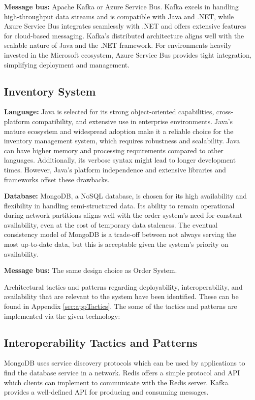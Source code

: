 \documentclass[conference]{IEEEtran}
\begin{document}
\textbf{Message bus:} Apache Kafka or Azure Service Bus. Kafka excels in handling high-throughput data streams and is compatible with Java and .NET, while Azure Service Bus integrates seamlessly with .NET and offers extensive features for cloud-based messaging. Kafka's distributed architecture aligns well with the scalable nature of Java and the .NET framework. For environments heavily invested in the Microsoft ecosystem, Azure Service Bus provides tight integration, simplifying deployment and management.


\subsection*{Inventory System}

\textbf{Language:} Java is selected for its strong object-oriented capabilities, cross-platform compatibility, and extensive use in enterprise environments. Java’s mature ecosystem and widespread adoption make it a reliable choice for the inventory management system, which requires robustness and scalability. Java can have higher memory and processing requirements compared to other languages. Additionally, its verbose syntax might lead to longer development times. However, Java's platform independence and extensive libraries and frameworks offset these drawbacks.

\textbf{Database:} MongoDB, a NoSQL database, is chosen for its high availability and flexibility in handling semi-structured data. Its ability to remain operational during network partitions aligns well with the order system's need for constant availability, even at the cost of temporary data staleness. The eventual consistency model of MongoDB is a trade-off between not always serving the most up-to-date data, but this is acceptable given the system's priority on availability.

\textbf{Message bus:} The same design choice as Order System.


Architectural tactics and patterns regarding deployability, interoperability, and availability that are relevant to the system have been identified. These can be found in Appendix \ref{sec:appTactics}. The some of the tactics and patterns are implemented via the given technology:
\subsection*{Interoperability Tactics and Patterns}
MongoDB uses service discovery protocols which can be used by applications to find the database service in a network.
Redis offers a simple protocol and API which clients can implement to communicate with the Redis server.
Kafka provides a well-defined API for producing and consuming messages.
\end{document}
